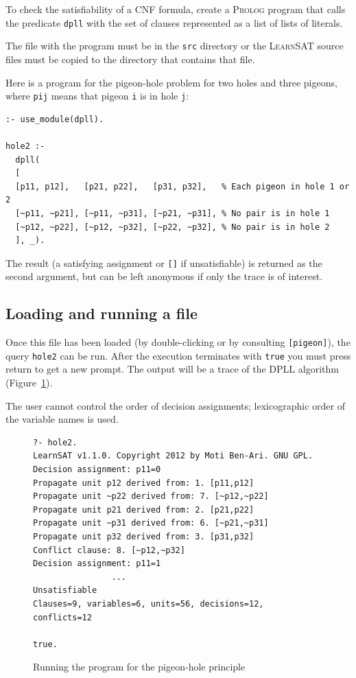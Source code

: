 \documentclass[11pt]{report}
\newcommand*{\p}[1]{\textup{\texttt{#1}}}
\newcommand*{\ls}{\textsc{LearnSAT}}
\newcommand*{\pl}{\textsc{Prolog}}
\begin{document}
To check the satisfiability of a CNF formula, create a \pl{} program
that calls the predicate \p{dpll} with the set of clauses represented as
a list of lists of literals.

The file with the program must be in the \p{src} directory or the \ls{}
source files must be copied to the directory that contains that file.

Here is a program for the pigeon-hole problem for two holes and three
pigeons, where \p{pij} means that pigeon \p{i} is in hole \p{j}:

\begin{verbatim}
:- use_module(dpll).

hole2 :-
  dpll(
  [
  [p11, p12],   [p21, p22],   [p31, p32],   % Each pigeon in hole 1 or 2 
  [~p11, ~p21], [~p11, ~p31], [~p21, ~p31], % No pair is in hole 1
  [~p12, ~p22], [~p12, ~p32], [~p22, ~p32], % No pair is in hole 2
  ], _).
\end{verbatim}

The result (a satisfying assignment or \p{[]} if unsatisfiable) is
returned as the second argument, but can be left anonymous if only
the trace is of interest.

\subsection{Loading and running a file}

Once this file has been loaded (by double-clicking or by consulting
\p{[pigeon]}), the query \p{hole2} can be run. After the execution
terminates with \p{true} you must press return to get a new prompt. The
output will be a trace of the DPLL algorithm (Figure~\ref{fig.pigeon}).

The user cannot control the order of decision assignments; lexicographic
order of the variable names is used.

\begin{figure}[tbp]
\begin{verbatim}
?- hole2.
LearnSAT v1.1.0. Copyright 2012 by Moti Ben-Ari. GNU GPL.
Decision assignment: p11=0
Propagate unit p12 derived from: 1. [p11,p12]
Propagate unit ~p22 derived from: 7. [~p12,~p22]
Propagate unit p21 derived from: 2. [p21,p22]
Propagate unit ~p31 derived from: 6. [~p21,~p31]
Propagate unit p32 derived from: 3. [p31,p32]
Conflict clause: 8. [~p12,~p32]
Decision assignment: p11=1
                ...
Unsatisfiable
Clauses=9, variables=6, units=56, decisions=12, conflicts=12

true.
\end{verbatim}
\caption{Running the program for the pigeon-hole principle}\label{fig.pigeon}
\end{figure}
\end{document}
